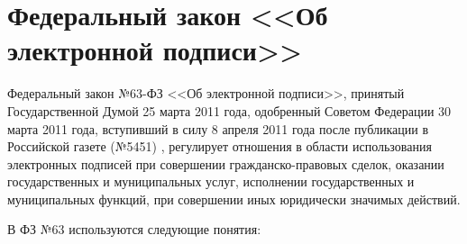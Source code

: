 \section{Федеральный закон <<Об электронной подписи>>} \label{rights_63}

Федеральный закон №63-ФЗ <<Об электронной подписи>>, принятый Государственной Думой 25 марта 2011 года, одобренный Советом Федерации 30 марта 2011 года, вступивший в силу 8 апреля 2011 года после публикации в Российской газете (№5451) \cite{rg-63fz}, регулирует отношения  в области использования электронных подписей при совершении гражданско-правовых сделок, оказании государственных и муниципальных услуг, исполнении государственных и муниципальных функций, при совершении иных юридически значимых действий.

\vspace{\baselineskip}
В ФЗ №63 используются следующие понятия:
